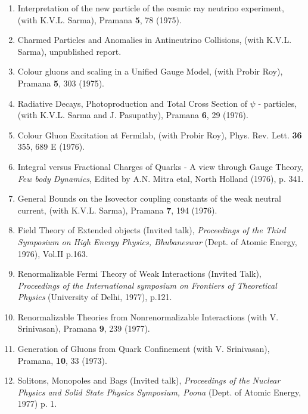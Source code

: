 \begin{enumerate}
\item Interpretation of the new particle of the cosmic ray neutrino
experiment, (with K.V.L. Sarma), Pramana {\bf 5}, 78 (1975).

\item Charmed Particles and Anomalies in Antineutrino Collisions, (with
K.V.L. Sarma), unpublished report. 

\item Colour gluons and scaling in a Unified Gauge Model, (with Probir
Roy), Pramana {\bf 5}, 303 (1975).

\item Radiative Decays, Photoproduction and Total Cross Section of
$\psi$ - particles, (with K.V.L. Sarma and J. Pasupathy), Pramana {\bf
6}, 29 (1976).

\item Colour Gluon Excitation at Fermilab, (with Probir Roy), Phys. Rev.
Lett. {\bf 36} 355, 689 E (1976).

\item Integral versus Fractional Charges of Quarks - A view through
Gauge Theory, {\em Few body Dynamics}, Edited by A.N. Mitra etal, North
Holland (1976), p. 341.

\item General Bounds on the Isovector coupling constants of the weak
neutral current, (with K.V.L. Sarma), Pramana {\bf 7}, 194 (1976).

\item Field Theory of Extended objects (Invited talk), {\it Proceedings of
the Third Symposium on High Energy Physics, Bhubaneswar} (Dept. of
Atomic Energy, 1976), Vol.II p.163.

\item Renormalizable Fermi Theory of Weak Interactions (Invited Talk),
{\it Proceedings of the International symposium on Frontiers of Theoretical
Physics} (University of Delhi, 1977), p.121.

\item Renormalizable Theories from Nonrenormalizable Interactions (with
V. Srinivasan), Pramana {\bf 9}, 239 (1977).

\item Generation of Gluons from Quark Confinement (with V. Srinivasan),
Pramana, {\bf 10}, 33 (1973).

\item Solitons, Monopoles and Bags (Invited talk), {\it Proceedings of the
Nuclear Physics and Solid State Physics Symposium, Poona} (Dept. of
Atomic Energy, 1977) p. 1.


\end{enumerate}
